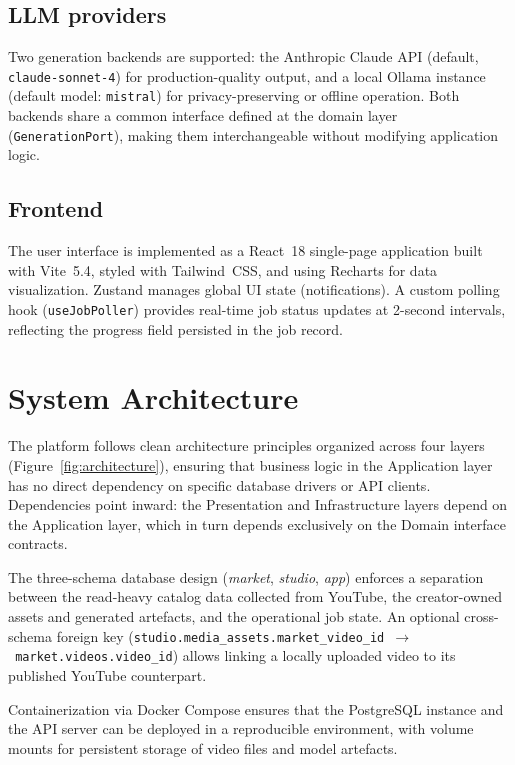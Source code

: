 \documentclass[ENG]{TFUOC}
\begin{document}
\subsection*{LLM providers}

Two generation backends are supported: the Anthropic Claude API (default, \texttt{claude-sonnet-4}) for production-quality output, and a local Ollama instance (default model: \texttt{mistral}) for privacy-preserving or offline operation. Both backends share a common interface defined at the domain layer (\texttt{GenerationPort}), making them interchangeable without modifying application logic.

\subsection*{Frontend}

The user interface is implemented as a React~18 single-page application built with Vite~5.4, styled with Tailwind~CSS, and using Recharts for data visualization. Zustand manages global UI state (notifications). A custom polling hook (\texttt{useJobPoller}) provides real-time job status updates at 2-second intervals, reflecting the progress field persisted in the job record.

\section{System Architecture}

The platform follows clean architecture principles organized across four layers (Figure~\ref{fig:architecture}), ensuring that business logic in the Application layer has no direct dependency on specific database drivers or API clients. Dependencies point inward: the Presentation and Infrastructure layers depend on the Application layer, which in turn depends exclusively on the Domain interface contracts.

The three-schema database design (\textit{market}, \textit{studio}, \textit{app}) enforces a separation between the read-heavy catalog data collected from YouTube, the creator-owned assets and generated artefacts, and the operational job state. An optional cross-schema foreign key (\texttt{studio.media\_assets.market\_video\_id~$\rightarrow$~market.videos.video\_id}) allows linking a locally uploaded video to its published YouTube counterpart.

Containerization via Docker Compose ensures that the PostgreSQL instance and the API server can be deployed in a reproducible environment, with volume mounts for persistent storage of video files and model artefacts.
\end{document}
